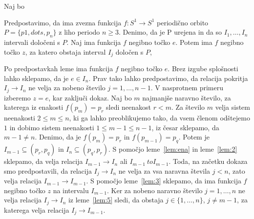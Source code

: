 \documentclass[../TG_magistrsko_delo_sections.tex]{subfiles}
\begin{document}
\begin{dokaz}
Naj bo
\end{dokaz}

\begin{lema}\label{lem:6}				%
Predpostavimo, da ima zvezna funkcija $f : S^1 \to S^1$ periodično orbito $P = \{p1, dots, p_n\}$ z liho periodo $n \geq 3$. Denimo, da je P urejena in da so $I_1, \dots, I_n$ intervali določeni s $P$. Naj ima funkcija $f$ negibno točko $e$. Potem ima $f$ negibno točko $z$, za katero obstaja interval $I_j$ določen s $P$, 
\end{lema}

\begin{dokaz}
Po predpostavkah leme ima funkcija $f$ negibno točko $e$. Brez izgube splošnosti lahko sklepamo, da je $e \in I_n$. Prav tako lahko predpostavimo, da relacija pokritja $I_j \to I_n$ ne velja za nobeno število $j = 1, \dots, n-1$. V nasprotnem primeru izberemo $z=e$, kar zaključi dokaz.
Naj bo $m$ najmanjše naravno število, za katerega iz enakosti $f(p_m) = p_r$ sledi neenakost $r < m$. Za število $m$ velja sistem neenakosti $2 \leq m \leq n$, ki ga lahko preoblikujemo tako, da vsem členom odštejemo $1$ in dobimo sistem neenakosti $1 \leq m -1 \leq n-1$, iz česar sklepamo, da $m-1 \neq n$. Denimo, da je $f(p_m) = p_r$ in $f(p_{m-1}) = p_q$. Potem je $I_{m-1} \subseteq (p_r, p_q)$ in $I_n \subseteq (p_q, p_r)$. S pomočjo leme~\ref{lem:ena} in leme~\ref{lem:2} sklepamo, da velja relacija $I_{m-1} \to I_n$ ali $I_{m-1} \ to I_{m-1}$. Toda, na začetku dokaza smo predpostavili, da relacija $I_{j} \to I_n$ ne velja za vsa naravna števila $j < n$, zato velja relacija $I_{m-1} \to I_{m-1}$. S pomočjo leme~\ref{lem:3} sklepamo, da ima funkcija $f$ negibno točko $z$ na intervalu $I_{m-1}$. Ker za nobeno naravno število $j = 1, \dots, n$ ne velja relacija $I_j \to I_n$ iz leme~\ref{lem:5} sledi, da obstaja $j \in \{1, \dots, n\}$, $j \neq m-1$, za katerega velja relacija $I_j \to I_{m-1}$.

\end{dokaz}
\end{document}
